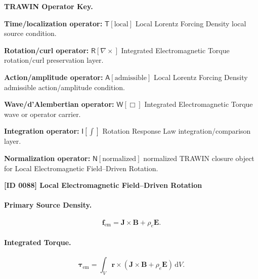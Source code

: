 \par\vspace{0.45\baselineskip}
\noindent\begin{minipage}[t]{\linewidth}
\begingroup
\small
\raggedright
\textbf{TRAWIN Operator Key.}\par
\noindent\textbf{Time/localization operator:} $\mathsf{T}\!\left[\mathrm{local}\right]$ Local Lorentz Forcing Density local source condition.\par
\noindent\textbf{Rotation/curl operator:} $\mathsf{R}\!\left[\nabla\times\right]$ Integrated Electromagnetic Torque rotation/curl preservation layer.\par
\noindent\textbf{Action/amplitude operator:} $\mathsf{A}\!\left[\mathrm{admissible}\right]$ Local Lorentz Forcing Density admissible action/amplitude condition.\par
\noindent\textbf{Wave/d'Alembertian operator:} $\mathsf{W}\!\left[\Box\right]$ Integrated Electromagnetic Torque wave or operator carrier.\par
\noindent\textbf{Integration operator:} $\mathsf{I}\!\left[\int\right]$ Rotation Response Law integration/comparison layer.\par
\noindent\textbf{Normalization operator:} $\mathsf{N}\!\left[\mathrm{normalized}\right]$ normalized TRAWIN closure object for Local Electromagnetic Field--Driven Rotation.\par
\endgroup
\end{minipage}

\clearpage
\noindent\textbf{[ID 0088] Local Electromagnetic Field--Driven Rotation}\par
\vspace{0.35em}
\paragraph{Primary Source Density.}
\begin{equation}
\mathbf{f}_{\mathrm{em}}
=
\mathbf{J}\times\mathbf{B}
+
\rho_e\mathbf{E}.
\end{equation}

\paragraph{Integrated Torque.}
\begin{equation}
\boldsymbol{\tau}_{\mathrm{em}}
=
\int_V
\mathbf{r}\times
\left(
\mathbf{J}\times\mathbf{B}
+
\rho_e\mathbf{E}
\right)
\,\mathrm{d}V .
\end{equation}

